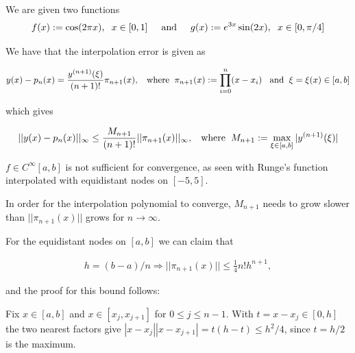 \documentclass{article}
\begin{document}
We are given two functions
\begin{align*}
    f(x) := \cos(2\pi x), \hspace{2mm} x \in [0, 1] \hspace{5mm} \text{and} \hspace{5mm} g(x) := e^{3x} \sin(2x), \hspace{2mm} x \in [0, \pi/4]
\end{align*}

We have that the interpolation error is given as

\begin{align*}
    y(x) - p_n(x) = \frac{y^{(n+1)}(\xi)}{(n+1)!} \pi_{n+1}(x), \hspace{3mm} \text{where} \hspace{2mm} \pi_{n+1}(x) := \prod_{i=0}^{n}(x - x_i) \hspace{3mm} \text{and} \hspace{2mm}\xi = \xi(x) \in [a,b]
\end{align*}

which gives

\begin{align*}
    ||y(x) - p_n(x)||_{\infty} \le \frac{M_{n+1}}{(n+1)!} ||\pi_{n+1}(x)||_{\infty}, \hspace{3mm} \text{where} \hspace{2mm} M_{n+1} := \max_{\xi \in [a,b]} |y^{(n+1)}(\xi)|
\end{align*}

$f \in C^{\infty}[a,b]$ is not sufficient for convergence, as seen with Runge's function
interpolated with equidistant nodes on $[-5,5]$.

In order for the interpolation polynomial to converge, $M_{n+1}$ needs to grow slower than
$||\pi_{n+1}(x)||$ grows for $n \to \infty$.

\vspace{5mm}
For the equidistant nodes on $[a,b]$ we can claim that

\begin{align*}
    h = (b - a)/n \Longrightarrow ||\pi_{n+1}(x)|| \le \frac{1}{4} n! h^{n+1},
\end{align*}

and the proof for this bound follows:

\vspace{5mm}
Fix $x \in [a,b]$ and $x \in [x_j,x_{j+1}]$ for $0 \le j \le n-1$. With $t = x - x_j \in [0,h]$ the two nearest factors give $|x-x_j||x-x_{j+1}| = t(h-t) \le h^2/4$, since $t = h/2$ is the maximum.
\end{document}
